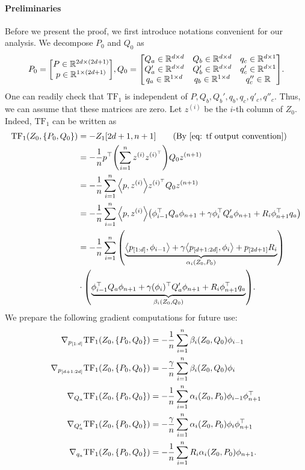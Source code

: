 \documentclass{article}
\newcommand{\explain}[1]{\tag*{(#1)}}
\newcommand{\R}{\mathbb{R}}
\newcommand{\indot}[2]{{\left<#1, #2\right>}}
\newcommand{\tf}{\text{TF}}
\newcommand{\paren}[1]{{\left(#1\right)}}
\begin{document}
\paragraph*{Preliminaries}
Before we present the proof, we first introduce notations convenient for our analysis.
We decompose $P_0$ and $Q_0$ as
\begin{align}
        P_0 = \mqty[P \in \R^{2d\times (2d+1)} \\
                 p \in \R^{1 \times (2d+1)}],
        Q_0 = \mqty[Q_a \in \R^{d\times d} &  Q_b \in \R^{d\times d} & q_c \in \R^{d\times 1} \\
                  Q_a' \in \R^{d\times d} & Q_b' \in \R^{d\times d} & q_c' \in \R^{d\times 1}\\
                  q_a \in \R^{1\times d} &  q_b \in \R^{1\times d} & q_c'' \in \R].
\end{align}
One can readily check that $\tf_1$ is independent of $P, Q_b, Q_b', q_b, q_c ,q'_c, q''_c$. Thus, we can assume that these matrices are zero.
Let $z^\paren{i}$ be the $i$-th column of $Z_0$.
Indeed, $\tf_1$ can be written as
 \begin{align}
        \tf_1(Z_0, \qty{P_0, Q_0})
        &= -Z_1\qty[2d+1,n+1] \explain{By \eqref{eq: tf output convention}}\\
        & = -\frac{1}{n} p^\top \qty(\sum_{i=1}^n z^{(i)} z^{(i)^\top})  Q_0 z^{(n+1)} \\
        & = -\frac{1}{n} \sum_{i=1}^n  \indot{p}{z^{(i)}} z^{(i)^\top} Q_0  z^{(n+1)}\\
        & = -\frac{1}{n} \sum_{i=1}^n \indot{p}{z^{(i)}}
        \qty(\phi_{i-1}^\top Q_a \phi_{n+1} + \gamma\phi_{i}^\top Q_a' \phi_{n+1} + R_{i} \phi_{n+1}^\top q_a) \label{eq: tf1 block matrix vector form}\\
        & = -\frac{1}{n} \sum_{i=1}^n
        \qty( \underbrace{\indot{p_{[1:d]}}{\phi_{i-1}} + \gamma \indot{p_{[d+1:2d]}}{\phi_i} + p_{[2d+1]} R_{i}}_{\alpha_i(Z_0, P_0)})\\
        & \cdot \qty(\underbrace{\phi_{i-1}^\top Q_a \phi_{n+1} + \gamma(\phi_i)^\top Q_a' \phi_{n+1} + R_i \phi_{n+1}^\top q_a}_{\beta_i(Z_0, Q_0)}).
    \end{align}
We prepare the following gradient computations for future use:
\begin{equation}
\label{eq: gradient formula}
   \begin{aligned}
      \nabla_{p_{[1:d]}} \tf_1(Z_0,\qty{P_0, Q_0}) & = -\frac{1}{n}\sum_{i=1}^n \beta_i(Z_0, Q_0) \phi_{i-1} \\
      \nabla_{p_{[d+1:2d]}} \tf_1(Z_0, \qty{P_0, Q_0}) & = -\frac{\gamma}{n} \sum_{i=1}^n \beta_i(Z_0, Q_0) \phi_i\\
      \nabla_{Q_a} \tf_1(Z_0,\qty{P_0, Q_0}) & = -\frac{1}{n} \sum_{i=1}^n \alpha_i(Z_0, P_0)  \phi_{i-1} \phi_{n+1}^\top \\
      \nabla_{Q_a'} \tf_1(Z_0,\qty{P_0, Q_0}) & = -\frac{\gamma}{n} \sum_{i=1}^n \alpha_i(Z_0, P_0)  \phi_i \phi_{n+1}^\top \\
      \nabla_{q_a} \tf_1(Z_0,\qty{P_0, Q_0}) & =  -\frac{1}{n} \sum_{i=1}^n R_{i} \alpha_i(Z_0, P_0) \phi_{n+1}.
   \end{aligned}
\end{equation}
\end{document}
